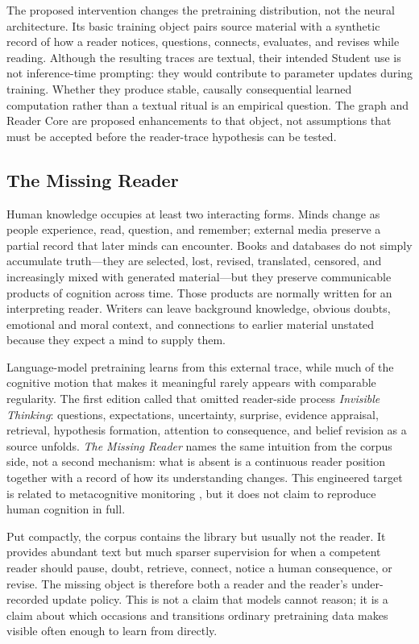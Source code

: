 \documentclass[11pt]{article}
\begin{document}
The proposed intervention changes the pretraining distribution, not the neural
architecture. Its basic training object pairs source material with a synthetic
record of how a reader notices, questions, connects, evaluates, and revises
while reading. Although the resulting traces are textual, their intended
Student use is not inference-time prompting: they would contribute to parameter
updates during training. Whether they produce stable, causally consequential
learned computation rather than a textual ritual is an empirical question. The
graph and Reader Core are proposed enhancements to that object, not assumptions
that must be accepted before the reader-trace hypothesis can be tested.

\subsection{The Missing Reader}\label{sec:invisible-thinking}

Human knowledge occupies at least two interacting forms. Minds change as people
experience, read, question, and remember; external media preserve a partial
record that later minds can encounter. Books and databases do not simply
accumulate truth---they are selected, lost, revised, translated, censored, and
increasingly mixed with generated material---but they preserve communicable
products of cognition across time. Those products are normally written for an
interpreting reader. Writers can leave background knowledge, obvious doubts,
emotional and moral context, and connections to earlier material unstated
because they expect a mind to supply them.

Language-model pretraining learns from this external trace, while much of the
cognitive motion that makes it meaningful rarely appears with comparable
regularity. The first edition called that omitted reader-side process
\emph{Invisible Thinking}: questions, expectations, uncertainty, surprise,
evidence appraisal, retrieval, hypothesis formation, attention to consequence,
and belief revision as a source unfolds. \emph{The Missing Reader} names the
same intuition from the corpus side, not a second mechanism: what is absent is a
continuous reader position together with a record of how its understanding
changes. This engineered target is related to metacognitive monitoring
\cite{flavell1979metacognition}, but it does not claim to reproduce human
cognition in full.

Put compactly, the corpus contains the library but usually not the reader. It
provides abundant text but much sparser supervision for when a competent reader
should pause, doubt, retrieve, connect, notice a human consequence, or revise.
The missing object is therefore both a reader and the reader's under-recorded
update policy. This is not a claim that models cannot reason; it is a claim about
which occasions and transitions ordinary pretraining data makes visible often
enough to learn from directly.
\end{document}
